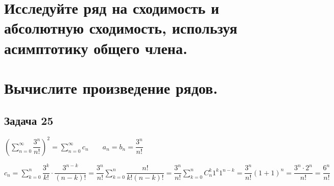 \documentclass[a4paper,fleqn]{article}
\begin{document}
	\section*{Исследуйте ряд на сходимость и абсолютную сходимость, используя асимптотику общего члена.}
	
	
	
	
	
	
	\section*{Вычислите произведение рядов.}
	
	\subsection*{Задача 25}
	$ \left(\sum_{n = 0}^{\infty}\dfrac{3^n}{n!}\right)^2  = \sum_{n=0}^{\infty} c_n \;\;\;\;\;\;\; a_n = b_n = \dfrac{3^n}{n!}$
	
	$ c_n = \sum_{k=0}^{n} \dfrac{3^k}{k!}\cdot \dfrac{3^{n-k}}{(n-k)!} = \dfrac{3^n}{n!} \sum_{k=0}^{n}\dfrac{n!}{k!(n-k)!} = \dfrac{3^n}{n!}\sum_{k=0}^{n}C_n^k 1^k1^{n-k} = \dfrac{3^n}{n!}(1+1)^n = \dfrac{3^n \cdot 2^n}{n!}  = \dfrac{6^n}{n!}$
	
\end{document}
